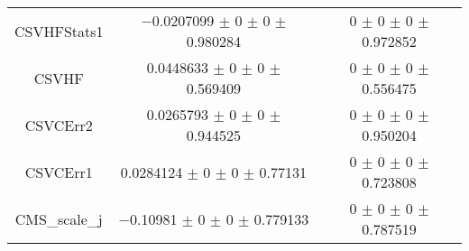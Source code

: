 \begin{table}
\begin{tabular}{ccc}
CSVHFStats1 & \num{-0.0207099} $\pm$ \num{0} $\pm$ \num{0} $\pm$ \num{0.980284} & \num{0} $\pm$ \num{0} $\pm$ \num{0} $\pm$ \num{0.972852}\\
CSVHF & \num{0.0448633} $\pm$ \num{0} $\pm$ \num{0} $\pm$ \num{0.569409} & \num{0} $\pm$ \num{0} $\pm$ \num{0} $\pm$ \num{0.556475}\\
CSVCErr2 & \num{0.0265793} $\pm$ \num{0} $\pm$ \num{0} $\pm$ \num{0.944525} & \num{0} $\pm$ \num{0} $\pm$ \num{0} $\pm$ \num{0.950204}\\
CSVCErr1 & \num{0.0284124} $\pm$ \num{0} $\pm$ \num{0} $\pm$ \num{0.77131} & \num{0} $\pm$ \num{0} $\pm$ \num{0} $\pm$ \num{0.723808}\\
CMS\_scale\_j & \num{-0.10981} $\pm$ \num{0} $\pm$ \num{0} $\pm$ \num{0.779133} & \num{0} $\pm$ \num{0} $\pm$ \num{0} $\pm$ \num{0.787519}\\
\bottomrule
\end{tabular}
\end{table}